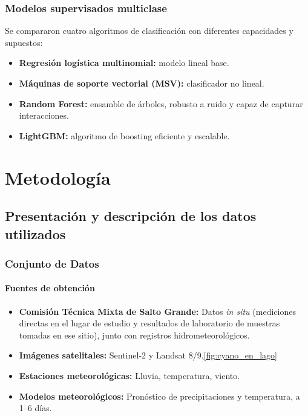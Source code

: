 \documentclass[11pt]{report}
\begin{document}
\subsection{Modelos supervisados multiclase}

Se compararon cuatro algoritmos de clasificación con diferentes capacidades y supuestos:

\begin{itemize}
  \item \textbf{Regresión logística multinomial:} modelo lineal base.
  \item \textbf{Máquinas de soporte vectorial (MSV):} clasificador no lineal.
  \item \textbf{Random Forest:} ensamble de árboles, robusto a ruido y capaz de capturar interacciones.
  \item \textbf{LightGBM:} algoritmo de boosting eficiente y escalable.
\end{itemize}


\chapter{Metodología}
\section{Presentación y descripción de los datos utilizados}
\subsection{Conjunto de Datos}

\subsubsection{Fuentes de obtención}
\begin{itemize}[noitemsep]
    \item \textbf{Comisión Técnica Mixta de Salto Grande:} Datos \textit{in situ} (mediciones directas en el lugar de estudio y resultados de laboratorio de muestras tomadas en ese sitio), junto con registros hidrometeorológicos.
    \item \textbf{Imágenes satelitales:} Sentinel-2 y Landsat 8/9.\ref{fig:cyano_en_lago}
    \item \textbf{Estaciones meteorológicas:} Lluvia, temperatura, viento.
    \item \textbf{Modelos meteorológicos:} Pronóstico de precipitaciones y temperatura, a 1–6 días.
\end{itemize}
\end{document}
